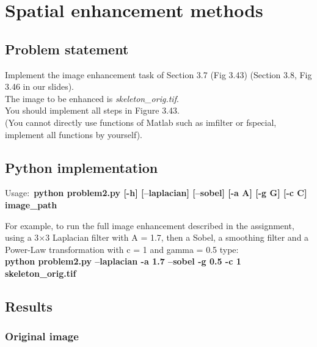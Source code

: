 \chapter{Spatial enhancement methods}

\section{Problem statement}

Implement the image enhancement task of Section 3.7 (Fig 3.43) (Section 3.8, Fig 3.46 in our slides).\\
The image to be enhanced is \textit{skeleton\_orig.tif}.\\
You should implement all steps in Figure 3.43. \\
(You cannot directly use functions of Matlab such as
imfilter or fspecial, implement all functions by yourself).

\section{Python implementation}

Usage:~\textbf{python problem2.py [-h] [--laplacian] [--sobel] [-a A] [-g G] [-c C] image\_path}

For example, to run the full image enhancement described in the assignment, using a 3$\times$3 Laplacian filter with A = 1.7,
then a Sobel, a smoothing filter and a Power-Law transformation with c = 1 and gamma = 0.5 type:~\\

\textbf{python problem2.py --laplacian -a 1.7 --sobel -g 0.5 -c 1 skeleton\_orig.tif} \\



\pagebreak
\section{Results}

    \subsection{Original image}

